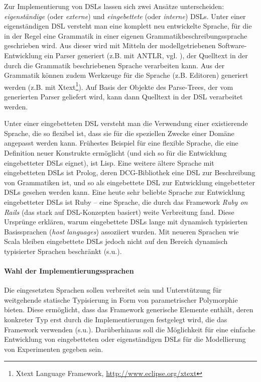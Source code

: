\documentclass[abstracton, 12pt]{scrartcl}
\begin{document}
Zur Implementierung von DSLs lassen sich zwei Ansätze unterscheiden: \emph{eigenständige} (oder \emph{externe}) und \emph{eingebettete} (oder \emph{interne}) DSLs. Unter einer eigenständigen DSL versteht man eine komplett neu entwickelte Sprache, für die in der Regel eine Grammatik in einer eigenen Grammatikbeschreibungssprache geschrieben wird. Aus dieser wird mit Mitteln der modellgetriebenen Software-Entwicklung ein Parser generiert (z.B. mit ANTLR, vgl. \citealt{Parr2007}), der Quelltext in der durch die Grammatik beschriebenen Sprache verarbeiten kann. Aus der Grammatik können zudem Werkzeuge für die Sprache (z.B. Editoren) generiert werden (z.B. mit Xtext\footnote{Xtext Language Framework, \url{http://www.eclipse.org/xtext}}). Auf Basis der Objekte des Parse-Trees, der vom generierten Parser geliefert wird, kann dann Quelltext in der DSL verarbeitet werden.

Unter einer eingebetteten DSL versteht man die Verwendung einer existierende Sprache, die so flexibel ist, dass sie für die speziellen Zwecke einer Domäne angepasst werden kann. Frühestes Beispiel für eine flexible Sprache, die eine Definition neuer Konstrukte ermöglicht (und sich so für die Entwicklung eingebetteter DSLs eignet), ist Lisp. Eine weitere ältere Sprache mit eingebetteten DSLs ist Prolog, deren DCG-Bibliothek eine DSL zur Beschreibung von Grammatiken ist, und so als eingebettete DSL zur Entwicklung eingebetteter DSLs gesehen werden kann. Eine heute sehr beliebte Sprache zur Entwicklung eingebetteter DSLs ist Ruby -- eine Sprache, die durch das Framework \emph{Ruby on Rails} (das stark auf DSL-Konzepten basiert) weite Verbreitung fand. Diese Ursprünge erklären, warum eingebettete DSLs lange mit dynamisch typisierten Basissprachen (\emph{host languages}) assoziiert wurden. Mit neueren Sprachen wie Scala bleiben eingebettete DSLs jedoch nicht auf den Bereich dynamisch typisierter Sprachen beschränkt (s.u.).

\paragraph{Wahl der Implementierungssprachen} \label{impl-langs}

Die eingesetzten Sprachen sollen verbreitet sein und Unterstützung für weitgehende statische Typisierung in Form von parametrischer Polymorphie bieten. Diese ermöglicht, dass das Framework generische Elemente enthält, deren konkreter Typ erst durch die Implementierungen festgelegt wird, die das Framework verwenden (s.u.). Darüberhinaus soll die Möglichkeit für eine einfache Entwicklung von eingebetteten oder eigenständigen DSLs für die Modellierung von Experimenten gegeben sein.
\end{document}
